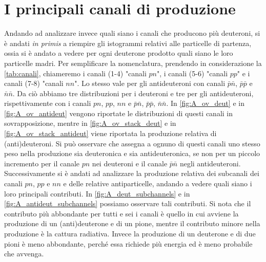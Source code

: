 \section{I principali canali di produzione}\label{ch:channels}
Andando ad analizzare invece quali siano i canali che producono più deuteroni, si è andati \textit{in primis} a riempire gli istogrammi relativi alle particelle di partenza, ossia si è andato a vedere per ogni deuterone prodotto quali siano le loro particelle madri.
Per semplificare la nomenclatura, prendendo in considerazione la \autoref{tab:canali}, chiameremo i canali (1-4) "canali $pn$", i canali (5-6) "canali $pp$" e i canali (7-8) "canali $nn$".
Lo stesso vale per gli antideuteroni con canali $\bar p\bar n$, $\bar p\bar p$ e $\bar n\bar n$.
Da ciò abbiamo tre distribuzioni per i deuteroni e tre per gli antideuteroni, rispettivamente con i canali $pn$, $pp$, $nn$ e $\bar p\bar n$, $\bar p\bar p$, $\bar n\bar n$.
In \autoref{fig:A_ov_deut} e in \autoref{fig:A_ov_antideut} vengono riportate le distribuzioni di questi canali in sovrapposizione, mentre in \autoref{fig:A_ov_stack_deut} e in \autoref{fig:A_ov_stack_antideut} viene riportata la produzione relativa di (anti)deuteroni.  
Si può osservare che \pythiaa{} assegna a ognuno di questi canali uno stesso peso nella produzione sia deuteronica e sia antideuteronica, se non per un piccolo incremento per il canale $pn$ nei deuteroni e il canale $\bar p\bar n$ negli antideuteroni.\\

Successivamente si è andati ad analizzare la produzione relativa dei subcanali dei canali $pn$, $pp$ e $nn$ e delle relative antiparticelle, andando a vedere quali siano i loro principali contributi.
In \autoref{fig:A_deut_subchannels} e in \autoref{fig:A_antideut_subchannels} possiamo osservare tali contributi.
Si nota che il contributo più abbondante per tutti e sei i canali è quello in cui avviene la produzione di un (anti)deuterone e di un pione, mentre il contributo minore nella produzione è la cattura radiativa.
Invece la produzione di un deuterone e di due pioni è meno abbondante, perché essa richiede più energia ed è meno probabile che avvenga.


